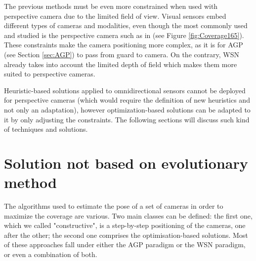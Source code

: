 The previous methods must be  even more constrained when used with perspective camera due to the limited field of view.  
Visual sensors embed different types of cameras and  modalities, even though the most commonly used and studied is the perspective camera such  as in \citep{149*mavrinac2013,174*zhang2016,193*fu2014,42*bulusu2001,165*jiang2010} (see Figure \ref{fig:Coverage165}). 
  These constraints make the camera positioning more complex, as it is for AGP (see Section \ref{sec:AGP}) to pass from guard to camera.
   On the contrary, WSN already takes into account the  limited depth of field  which  makes them more  suited  to perspective cameras.
   
Heuristic-based solutions applied to omnidirectional sensors cannot be deployed for perspective cameras (which would require the definition of new heuristics and not only an adaptation), however optimization-based solutions can be adapted to it by only adjusting the constraints. The following sections will discuss such kind of techniques and solutions. 
 
 
 
  

	\section{Solution not based on evolutionary method}\label{sec:NonEAmethod}
	
The algorithms used to estimate the pose of a set of cameras in order to maximize the coverage are various. Two main classes can be defined: the first one, which we called "constructive", is a step-by-step positioning of the cameras, one after the other; the second one comprises the optimisation-based solutions. Most of these approaches fall under either the AGP paradigm or the WSN paradigm, or even a combination of both.\\

